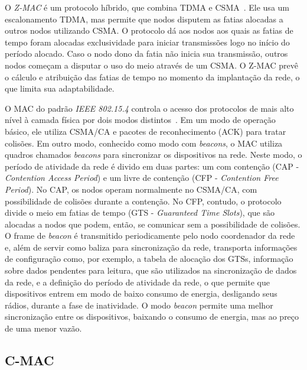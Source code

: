 O \emph{Z-MAC} é um protocolo híbrido, que combina TDMA e CSMA~\cite{Rhee:2008}.
Ele usa um escalonamento TDMA, mas permite que nodos disputem as fatias alocadas
a outros nodos utilizando CSMA. O protocolo dá aos nodos aos quais as fatias de
tempo foram alocadas exclusividade para iniciar transmissões logo no início do
período alocado. Caso o nodo dono da fatia não inicia sua transmissão, outros
nodos começam a disputar o uso do meio através de um CSMA. O Z-MAC prevê o
cálculo e atribuição das fatias de tempo no momento da implantação da rede, o
que limita sua adaptabilidade.

O MAC do padrão \emph{IEEE 802.15.4} controla o acesso dos protocolos de mais
alto nível à camada física por dois modos distintos~\cite{IEEE:2006}.
Em um modo de operação básico, ele utiliza CSMA/CA e pacotes de reconhecimento
(ACK) para tratar colisões. Em outro modo, conhecido como modo com
\textit{beacons}, o MAC utiliza quadros chamados \textit{beacons} para
sincronizar os dispositivos na rede. Neste modo, o período de atividade da rede
é divido em duas partes: um com contenção (CAP - \textit{Contention Access
Period}) e um livre de contenção (CFP - \textit{Contention Free Period}). No
CAP, os nodos operam normalmente no CSMA/CA, com possibilidade de colisões
durante a contenção. No CFP, contudo, o protocolo divide o meio em fatias de
tempo (GTS - \textit{Guaranteed Time Slots}), que são alocadas a nodos que
podem, então, se comunicar sem a possibilidade de colisões. O frame de
\textit{beacon} é transmitido periodicamente pelo nodo coordenador da rede e,
além de servir como baliza para sincronização da rede, transporta informações de
configuração como, por exemplo, a tabela de alocação dos GTSs, informação sobre
dados pendentes para leitura, que são utilizados na sincronização de dados da
rede, e a definição do período de atividade da rede, o que permite que
dispositivos entrem em modo de baixo consumo de energia, desligando seus rádios,
durante a fase de inatividade. O modo \textit{beacon} permite uma melhor
sincronização entre os dispositivos, baixando o consumo de energia, mas ao preço
de uma menor vazão.

\subsection{C-MAC}
\label{sec:cmac}

